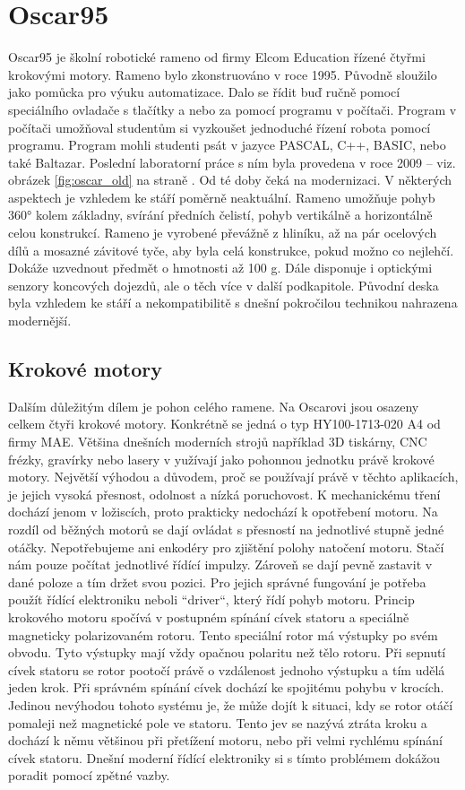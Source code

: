 \section{Oscar95}
Oscar95 je školní robotické rameno od firmy Elcom Education řízené čtyřmi krokovými 
motory. Rameno bylo zkonstruováno v roce 1995. Původně sloužilo jako pomůcka pro 
výuku automatizace. Dalo se řídit buď ručně pomocí speciálního ovladače s tlačítky a nebo za pomocí programu v počítači. Program v počítači umožňoval studentům si vyzkoušet jednoduché řízení robota pomocí programu. Program mohli studenti psát v jazyce PASCAL, C++, BASIC, nebo také Baltazar. Poslední laboratorní práce s ním byla provedena v roce 2009 -- viz. obrázek \ref{fig:oscar_old}  na straně 
\pageref{fig:oscar_old}. Od té doby čeká na modernizaci. V některých aspektech je vzhledem ke stáří poměrně neaktuální. 
Rameno umožňuje pohyb 360° kolem základny, svírání předních čelistí, pohyb vertikálně a 
horizontálně celou konstrukcí. Rameno je vyrobené převážně z hliníku, až na pár ocelových 
dílů a mosazné závitové tyče, aby byla celá konstrukce, pokud možno co nejlehčí. Dokáže 
uzvednout předmět o hmotnosti až 100 g. Dále disponuje i optickými senzory koncových 
dojezdů, ale o těch více v další podkapitole. Původní deska byla vzhledem ke stáří a 
nekompatibilitě s dnešní pokročilou technikou nahrazena modernější. \cite{Oscar95} \cite{staveb-robot}
\subsection{Krokové motory}
Dalším důležitým dílem je pohon celého ramene. Na Oscarovi jsou osazeny celkem čtyři
krokové motory. Konkrétně se jedná o typ HY100-1713-020 A4 od firmy MAE. Většina 
dnešních moderních strojů například 3D tiskárny, CNC frézky, gravírky nebo lasery v yužívají 
jako pohonnou jednotku právě krokové motory. Největší výhodou a důvodem, proč se používají 
právě v těchto aplikacích, je jejich vysoká přesnost, odolnost a nízká poruchovost. 
K mechanickému tření dochází jenom v ložiscích, proto prakticky nedochází k opotřebení 
motoru. Na rozdíl od běžných motorů se dají ovládat s přesností na jednotlivé stupně jedné 
otáčky. Nepotřebujeme ani enkodéry pro zjištění polohy natočení motoru. Stačí nám pouze 
počítat jednotlivé řídící impulzy. Zároveň se dají pevně zastavit v dané poloze a tím držet svou 
pozici. Pro jejich správné fungování je potřeba použít řídící elektroniku neboli “driver“, který
řídí pohyb motoru. Princip krokového motoru spočívá v postupném spínání cívek statoru a 
speciálně magneticky polarizovaném rotoru. Tento speciální rotor má výstupky po svém 
obvodu. Tyto výstupky mají vždy opačnou polaritu než tělo rotoru. Při sepnutí cívek statoru se 
rotor pootočí právě o vzdálenost jednoho výstupku a tím udělá jeden krok. Při správném spínání 
cívek dochází ke spojitému pohybu v krocích. Jedinou nevýhodou tohoto systému je, že může 
dojít k situaci, kdy se rotor otáčí pomaleji než magnetické pole ve statoru. Tento jev se nazývá 
ztráta kroku a dochází k němu většinou při přetížení motoru, nebo při velmi rychlému spínání 
cívek statoru. Dnešní moderní řídící elektroniky si s tímto problémem dokážou poradit pomocí 
zpětné vazby. \cite{krokove} \cite{bibtex:Kratochvíl}
